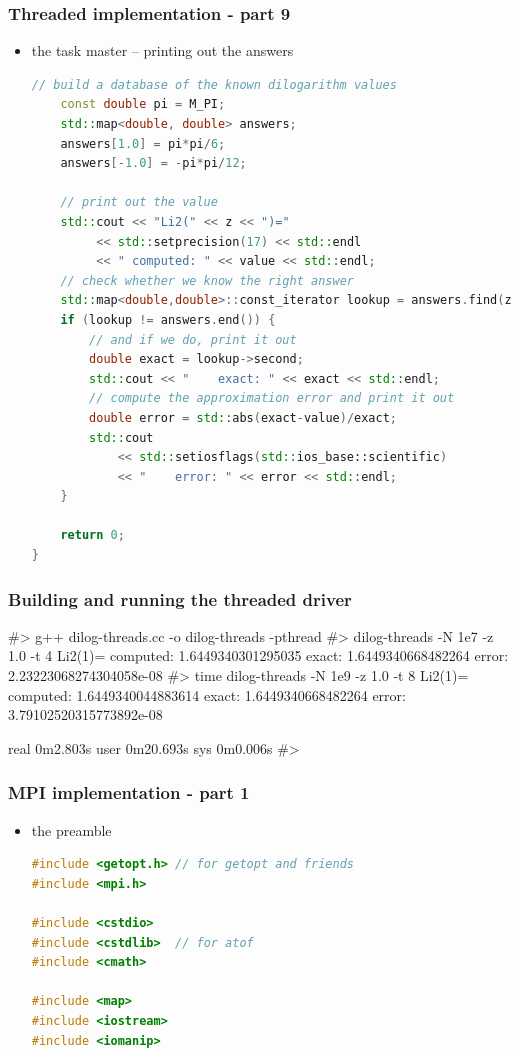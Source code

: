 \begin{frame}[fragile]
%
  \frametitle{Threaded implementation - part 9}
%
  \begin{itemize}
  \item the task master -- printing out the answers
  \begin{lstlisting}[language=c++,name=threaded]
    // build a database of the known dilogarithm values
    const double pi = M_PI;
    std::map<double, double> answers;
    answers[1.0] = pi*pi/6;
    answers[-1.0] = -pi*pi/12;

    // print out the value
    std::cout << "Li2(" << z << ")="
         << std::setprecision(17) << std::endl
         << " computed: " << value << std::endl;
    // check whether we know the right answer
    std::map<double,double>::const_iterator lookup = answers.find(z);
    if (lookup != answers.end()) {
        // and if we do, print it out
        double exact = lookup->second;
        std::cout << "    exact: " << exact << std::endl;
        // compute the approximation error and print it out
        double error = std::abs(exact-value)/exact;
        std::cout 
            << std::setiosflags(std::ios_base::scientific) 
            << "    error: " << error << std::endl;
    }

    return 0;
}
  \end{lstlisting}
%
  \end{itemize}
%
\end{frame}

\begin{frame}[fragile]
%
  \frametitle{Building and running the threaded driver}
%
  \begin{shell}{}
#> g++ dilog-threads.cc -o dilog-threads -pthread
#> dilog-threads -N 1e7 -z 1.0 -t 4
Li2(1)=
 computed: 1.6449340301295035
    exact: 1.6449340668482264
    error: 2.23223068274304058e-08
#> time dilog-threads -N 1e9 -z 1.0 -t 8
Li2(1)=
 computed: 1.6449340044883614
    exact: 1.6449340668482264
    error: 3.79102520315773892e-08

real    0m2.803s
user    0m20.693s
sys     0m0.006s
#>
  \end{shell}
%
\end{frame}

\begin{frame}[fragile]
%
  \frametitle{MPI implementation - part 1}
%
  \begin{itemize}
  \item the preamble
  \begin{lstlisting}[language=c++,name=mpi]
#include <getopt.h> // for getopt and friends
#include <mpi.h>

#include <cstdio>
#include <cstdlib>  // for atof
#include <cmath>

#include <map>
#include <iostream>
#include <iomanip>

  \end{lstlisting}
%
  \end{itemize}
%
\end{frame}

